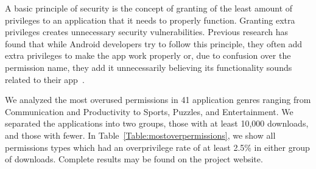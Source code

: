\documentclass[conference]{IEEEtran}
\begin{document}
A basic principle of security is the concept of granting of the least amount of privileges to an application that it needs to properly function. Granting extra privileges creates unnecessary security vulnerabilities. Previous research has found that while Android developers try to follow this principle, they often add extra privileges to make the app work properly or, due to confusion over the permission name, they add it unnecessarily believing its functionality sounds related to their app~\cite{Felt:2011:APD:2046707.2046779}.

We analyzed the most overused permissions in 41 application genres ranging from Communication and Productivity to Sports, Puzzles, and Entertainment. We separated the applications into two groups, those with at least 10,000 downloads, and those with fewer. In Table~\ref{Table:mostoverpermissions}, we show all permissions types which had an overprivilege rate of at least 2.5\% in either group of downloads. Complete results may be found on the project website.
\end{document}
